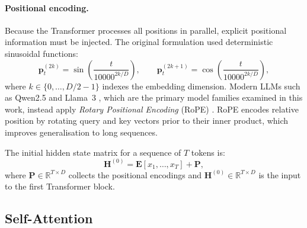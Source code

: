 \paragraph{Positional encoding.}
Because the Transformer processes all positions in parallel, explicit positional
information must be injected. The original formulation \citep{vaswani2017attention}
used deterministic sinusoidal functions:
\begin{equation}
    \mathbf{p}_t^{(2k)} = \sin\!\left(\frac{t}{10000^{2k/D}}\right), \qquad
    \mathbf{p}_t^{(2k+1)} = \cos\!\left(\frac{t}{10000^{2k/D}}\right),
    \label{eq:sinusoidal_pe}
\end{equation}
where $k \in \{0, \ldots, D/2-1\}$ indexes the embedding dimension. Modern LLMs such as Qwen2.5 \citep{qwen2025qwen25} and Llama~3 \citep{grattafiori2024llama3}, which are the primary model families examined in this work, instead apply \emph{Rotary Positional Encoding} (RoPE) \citep{su2024roformer}. RoPE encodes relative position by rotating query and key vectors prior to their inner product, which improves generalisation to long sequences.

The initial hidden state matrix for a sequence of $T$ tokens is:
\begin{equation}
    \mathbf{H}^{(0)} = \mathbf{E}[x_1, \ldots, x_T] + \mathbf{P},
    \label{eq:initial_hidden}
\end{equation}
where $\mathbf{P} \in \mathbb{R}^{T \times D}$ collects the positional encodings and
$\mathbf{H}^{(0)} \in \mathbb{R}^{T \times D}$ is the input to the first
Transformer block.

\subsection{Self-Attention}
\label{subsec:self_attention}

